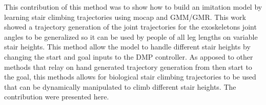 This contribution of this method was to show how to build an imitation model by learning stair climbing trajectories using mocap and GMM/GMR. This work showed a trajectory generation of the joint trajectories for the exoskeletons joint angles to be generalized so it can be used by people of all leg lengths on variable stair heights. This method allow the model to handle different stair heights by changing the start and goal inputs to the DMP controller. As apposed to other methods that relay on hand generated trajectory generation from then start to the goal, this methods allows for biological stair climbing trajectories to be used that can be dynamically manipulated to climb different stair heights. The contribution were presented here\cite{goldfarb2021towards}.


